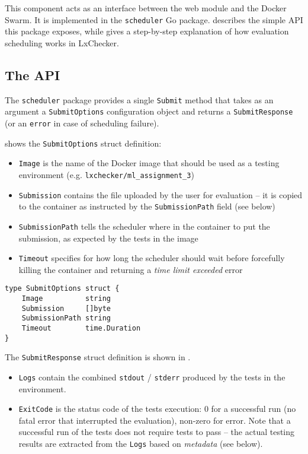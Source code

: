 This component acts as an interface between the web module and the Docker Swarm. It is implemented in the \texttt{scheduler} Go package.  describes the simple API this package exposes, while  gives a step-by-step explanation of how evaluation scheduling works in LxChecker. 

\subsection{The API}
\label{sub-sec:scheduler-api}

The \texttt{scheduler} package provides a single \texttt{Submit} method that takes as an argument a \texttt{SubmitOptions} configuration object and returns a \texttt{SubmitResponse} (or an \texttt{error} in case of scheduling failure).

 shows the \texttt{SubmitOptions} struct definition:
\begin{itemize}
	\item \texttt{Image} is the name of the Docker image that should be used as a testing environment (e.g. \texttt{lxchecker/ml_assignment_3})
	\item \texttt{Submission} contains the file uploaded by the user for evaluation -- it is copied to the container as instructed by the \texttt{SubmissionPath} field (see below)
	\item \texttt{SubmissionPath} tells the scheduler where in the container to put the submission, as expected by the tests in the image
	\item \texttt{Timeout} specifies for how long the scheduler should wait before forcefully killing the container and returning a \textit{time limit exceeded} error
\end{itemize}

\begin{lstlisting}
type SubmitOptions struct {
	Image          string
	Submission     []byte
	SubmissionPath string
	Timeout        time.Duration
}
\end{lstlisting}

The \texttt{SubmitResponse} struct definition is shown in .
\begin{itemize}
	\item \texttt{Logs} contain the combined \texttt{stdout} / \texttt{stderr} produced by the tests in the environment.
	\item \texttt{ExitCode} is the status code of the tests execution: 0 for a successful run (no fatal error that interrupted the evaluation), non-zero for error. Note that a successful run of the tests does not require tests to pass -- the actual testing results are extracted from the \texttt{Logs} based on \textit{metadata} (see below).
\end{itemize}

